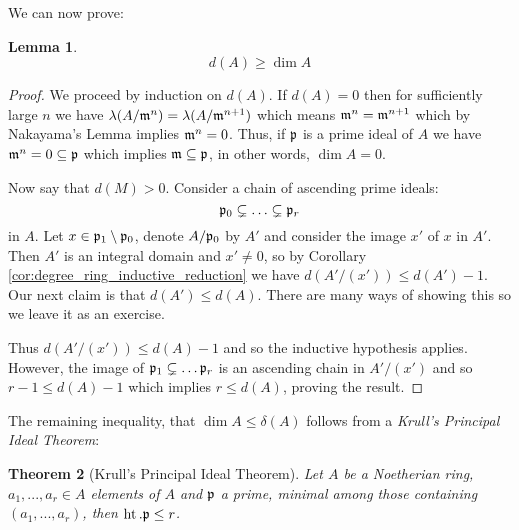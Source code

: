 \documentclass[12pt]{article}
\theoremstyle{plain}
\newtheorem{thm}{Theorem}[subsection] %
\newtheorem{lemma}[thm]{Lemma}
\theoremstyle{definition}
\begin{document}
We can now prove:
\begin{lemma}
\[d(A) \geq \operatorname{dim}A\]
\end{lemma}
\begin{proof}
We proceed by induction on $d(A)$. If $d(A) = 0$ then for sufficiently large $n$ we have $\lambda(A/\frak{m}^n) = \lambda(A/\frak{m}^{n+1})$ which means $\frak{m}^n = \frak{m}^{n+1}$ which by Nakayama's Lemma implies $\frak{m}^n = 0$. Thus, if $\frak{p}$ is a prime ideal of $A$ we have $\frak{m}^n = 0 \subseteq \frak{p}$ which implies $\frak{m} \subseteq \frak{p}$, in other words, $\operatorname{dim}A = 0$.

Now say that $d(M) > 0$. Consider a chain of ascending prime ideals:
\[\frak{p}_0 \subsetneq \hdots \subsetneq \frak{p}_r\]
in $A$. Let $x \in \frak{p}_1\setminus\frak{p}_0$, denote $A/\frak{p}_0$ by $A'$ and consider the image $x'$ of $x$ in $A'$. Then $A'$ is an integral domain and $x' \neq 0$, so by Corollary \ref{cor:degree_ring_inductive_reduction} we have $d(A'/(x')) \leq d(A') - 1$. Our next claim is that $d(A') \leq d(A)$. There are many ways of showing this so we leave it as an exercise.

Thus $d(A'/(x')) \leq d(A) - 1$ and so the inductive hypothesis applies. However, the image of $\frak{p}_1 \subsetneq \hdots \frak{p}_r$ is an ascending chain in $A'/(x')$ and so $r - 1 \leq d(A) - 1$ which implies $r \leq d(A)$, proving the result.
\end{proof}
The remaining inequality, that $\operatorname{dim}A \leq \delta(A)$ follows from a \emph{Krull's Principal Ideal Theorem}:
\begin{thm}[Krull's Principal Ideal Theorem]
Let $A$ be a Noetherian ring, $a_1,...,a_r \in A$ elements of $A$ and $\frak{p}$ a  prime, minimal among those containing $(a_1,...,a_r)$, then $\operatorname{ht}.\frak{p} \leq r$.
\end{thm}
\end{document}

